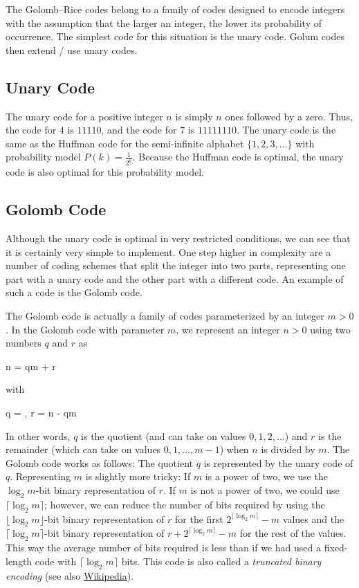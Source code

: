 
The Golomb–Rice codes belong to a family of codes designed to encode integers with the assumption that the larger an integer, the lower its probability of occurrence. The simplest code for this situation is the unary code. Golum codes then extend / use unary codes.

\subsection{Unary Code}

The unary code for a positive integer $n$ is simply $n$ ones followed by a zero. Thus, the code for $4$ is $11110$, and the code for $7$ is $11111110$. The unary code is the same as the Huffman code for the semi-infinite alphabet $\{1, 2, 3, \ldots \}$ with probability model $P(k) = \frac{1}{2^k}$. Because the Huffman code is optimal, the unary code is also optimal for this probability model.

\subsection{Golomb Code}

Although the unary code is optimal in very restricted conditions, we can see that it is certainly very simple to implement. One step higher in complexity are a number of coding schemes that split the integer into two parts, representing one part with a unary code and the other part with a different code. An example of such a code is the Golomb code.

The Golomb code is actually a family of codes parameterized by an integer $m > 0$. In the Golomb code with parameter $m$, we represent an integer $n > 0$ using two numbers $q$ and $r$ as

\bee
n = qm + r
\eee

with

\bee
q = \left\lfloor {} \right\rfloor, \qquad r = n - qm
\eee


In other words, $q$ is the quotient (and can take on values $0, 1, 2, \ldots$) and $r$ is the remainder (which can take on values $0, 1, \ldots, m-1$) when $n$ is divided by $m$. The Golomb code works as follows: The quotient $q$ is represented by the unary code of $q$. Representing $m$ is slightly more tricky: If $m$ is a power of two, we use the $\log_2 m$-bit binary representation of $r$. If $m$ is not a power of two, we could use $\lceil \log_2 m \rceil$; however, we can reduce the number of bits required by using the $\lfloor \log_2 m \rfloor$-bit binary representation of $r$ for the first $2^{\lceil \log_2 m \rceil} - m$ values and the $\lceil \log_2 m \rceil$-bit binary representation of $r + 2^{\lceil \log_2 m \rceil} - m$ for the rest of the values. This way the average number of bits required is less than if we had used a fixed-length code with $\lceil \log_2 m \rceil$ bits. This code is also called a \emph{truncated binary encoding} (see also \href{https://en.wikipedia.org/wiki/Truncated_binary_encoding}{Wikipedia}).

